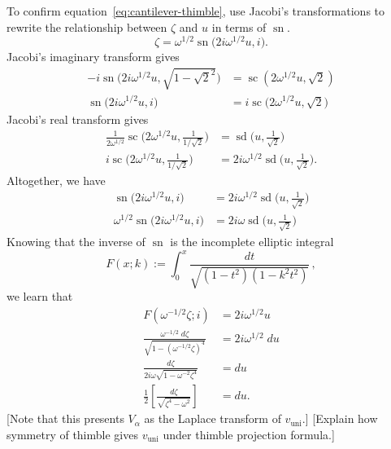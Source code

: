 \documentclass{article}
\theoremstyle{definition}
\theoremstyle{plain}
\newenvironment{verify}{\color{ForestGreen}}{\color{black}}
\newenvironment{todo}{\color{Coral}}{\color{black}}
\begin{document}
To confirm equation~\eqref{eq:cantilever-thimble}, use Jacobi's transformations to rewrite the relationship between $\zeta$ and $u$ in terms of $\operatorname{sn}$.
\[ \zeta = \omega^{1/2} \operatorname{sn}\big(2i \omega^{1/2} u, i\big). \]
\begin{verify}
Jacobi's imaginary transform gives
\begin{align*}
-i \operatorname{sn}\big(2i \omega^{1/2} u, \sqrt{1-\sqrt{2}^2}\big) & = \operatorname{sc}(2\omega^{1/2} u, \sqrt{2}) \\
\operatorname{sn}\big(2i \omega^{1/2} u, i\big) & = i \operatorname{sc}\big(2\omega^{1/2} u,\sqrt{2}\big)
\end{align*}
Jacobi's real transform gives
\begin{align*}
\frac{1}{2\omega^{1/2}} \operatorname{sc}\big(2\omega^{1/2} u, \tfrac{1}{1/\sqrt{2}}\big) & = \operatorname{sd}\big(u, \tfrac{1}{\sqrt{2}}\big) \\
i \operatorname{sc}\big(2\omega^{1/2} u, \tfrac{1}{1/\sqrt{2}}\big) & = 2i \omega^{1/2} \operatorname{sd}\big(u, \tfrac{1}{\sqrt{2}}\big).
\end{align*}
Altogether, we have
\begin{align*}
\operatorname{sn}\big(2i \omega^{1/2} u, i\big) & = 2i \omega^{1/2} \operatorname{sd}\big(u, \tfrac{1}{\sqrt{2}}\big) \\
\omega^{1/2} \operatorname{sn}\big(2i \omega^{1/2} u, i\big) & = 2i\omega \operatorname{sd}\big(u, \tfrac{1}{\sqrt{2}}\big)
\end{align*}
\end{verify}
Knowing that the inverse of $\operatorname{sn}$ is the incomplete elliptic integral
\begin{equation}
F(x;k):=\int_0^x \frac{dt}{\sqrt{(1-t^2)(1-k^2t^2)}}\,,
\end{equation}
we learn that
\begin{align*}
F(\omega^{-1/2} \zeta; i) & = 2i \omega^{1/2} u \\
\frac{\omega^{-1/2}\;d\zeta}{\sqrt{1 - (\omega^{-1/2} \zeta)^4}} & = 2i \omega^{1/2}\;du \\
\frac{d\zeta}{2i \omega \sqrt{1 - \omega^{-2} \zeta^4}} & = du \\
\frac{1}{2}\left[\frac{d\zeta}{\sqrt{\zeta^4 - \omega^2}}\right] & = du.
\end{align*}
\begin{todo}[Note that this presents $V_\alpha$ as the Laplace transform of $v_\text{uni}$.]\end{todo} \begin{todo}[Explain how symmetry of thimble gives $v_\text{uni}$ under thimble projection formula.]\end{todo}
%
\appendix
%
\end{document}
